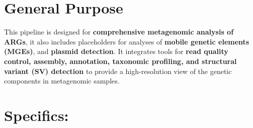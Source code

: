 \documentclass[11pt]{article}
\begin{document}
\section*{General Purpose}

This pipeline is designed for \textbf{comprehensive metagenomic analysis of ARGs}, it also includes placeholders for analyses of \textbf{mobile genetic elements (MGEs)}, and \textbf{plasmid detection}. It integrates tools for \textbf{read quality control, assembly, annotation, taxonomic profiling, and structural variant (SV) detection} to provide a high-resolution view of the genetic components in metagenomic samples.

\section*{Specifics:}
\end{document}
